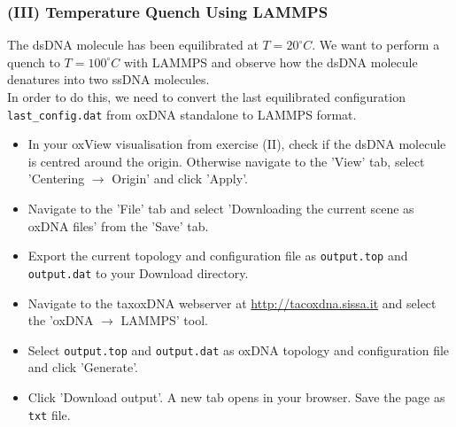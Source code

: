 \documentclass[slidestop,compress,9pt]{beamer}
\begin{document}
\begin{frame}[fragile]
\frametitle{(III) Temperature Quench Using LAMMPS}
\small

The dsDNA molecule has been equilibrated at $T=20^\circ C$. We want to perform a quench to $T=100^\circ C$ with LAMMPS and observe how the dsDNA molecule denatures into two ssDNA molecules.\\[10pt]
In order to do this, we need to convert the last equilibrated configuration \texttt{last\_config.dat} from oxDNA standalone to LAMMPS format.\\[10pt]

\begin{itemize}
\setlength\itemsep{5pt}
\item In your oxView visualisation from exercise (II), check if the dsDNA molecule is centred around the origin. Otherwise navigate to the 'View' tab, select 'Centering $\rightarrow$ Origin' and click 'Apply'.
\item Navigate to the 'File' tab and select 'Downloading the current scene as oxDNA files' from the 'Save' tab. 
\item Export the current topology and configuration file as \texttt{output.top} and \texttt{output.dat} to your Download directory.
\item Navigate to the taxoxDNA webserver at \href{http://tacoxdna.sissa.it}{http://tacoxdna.sissa.it} and select the 'oxDNA $\rightarrow$ LAMMPS' tool.
\item Select \texttt{output.top} and \texttt{output.dat} as oxDNA topology and configuration file and click 'Generate'.
\item Click 'Download output'. A new tab opens in your browser. Save the page as \texttt{txt} file.  
\end{itemize}

\end{frame}
\end{document}
